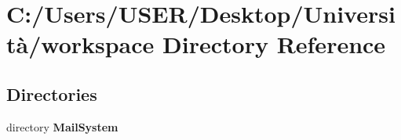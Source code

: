 \section{C\+:/\+Users/\+U\+S\+E\+R/\+Desktop/\+Università/workspace Directory Reference}
\label{dir_25e389f49ce98d52d260f9bfc771cfcb}
\subsection*{Directories}
\begin{DoxyCompactItemize}
\item 
directory \textbf{ Mail\+System}
\end{DoxyCompactItemize}
